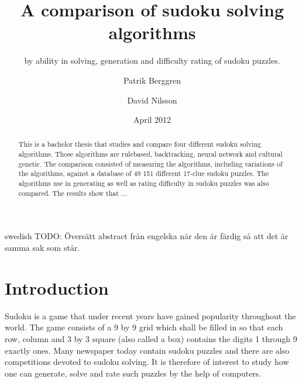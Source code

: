 \documentclass[a4paper,11pt]{kth-mag}
\title{A comparison of sudoku solving algorithms}
\subtitle{by ability in solving, generation and difficulty rating of sudoku puzzles.}
\author{Patrik Berggren \and David Nilsson}
\date{April 2012}
\begin{document}
\frontmatter
\pagestyle{empty}
\removepagenumbers
\maketitle
{}
\begin{abstract}
This is a bachelor thesis that studies and compare four different sudoku
solving algorithms. Those algorithms are rulebased, backtracking, neural network and 
cultural genetic.  The comparison consisted of measuring the algorithms, including
variations of the algorithms, against a database of 49 151 different 17-clue sudoku
puzzles. The algorithms use in generating as well as rating difficulty in sudoku
puzzles was also compared. The results show that ...
\end{abstract}
\clearpage
\begin{foreignabstract}{swedish}
TODO: Översätt abstract från engelska när den är färdig så att det är samma sak som står.
\end{foreignabstract}
\clearpage
\tableofcontents*
\mainmatter
\pagestyle{newchap}
\chapter{Introduction}
Sudoku is a game that under recent years have gained popularity throughout the world. 
The game consists of a 9 by 9 grid which shall be filled in so that each 
row, column and 3 by 3 square (also called a box) contains the digits 
1 through 9 exactly ones. 
Many newspaper today contain sudoku puzzles and there are also competitions devoted 
to sudoku solving. It is therefore of interest to study how one can generate, 
solve and rate such puzzles by the help of computers.
\end{document}
